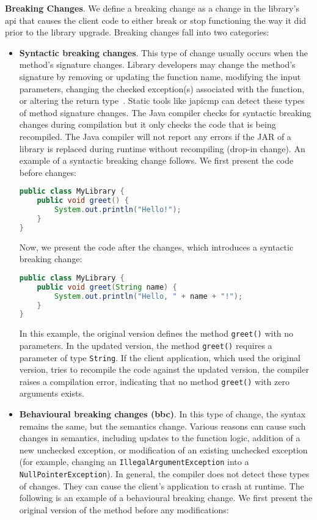 \textbf{Breaking Changes}. We define a breaking change as a change in the library's \gls{api} that
causes the client code to either break or stop functioning the way it did prior to the library upgrade.
Breaking changes fall into two categories:
\begin{itemize}
    \item \textbf{Syntactic breaking changes}. This type of change usually occurs when the method's
    signature changes. Library developers may change the method's signature by removing or updating
    the function name, modifying the input parameters, changing the checked exception(s) associated
    with the function, or altering the return type~\cite{jayasuriya24}. Static tools like japicmp
    can detect these types of method signature changes. The Java compiler checks for syntactic breaking
    changes during compilation but it only checks the code that is being recompiled. The Java compiler
    will not report any errors if the JAR of a library is replaced during runtime without recompiling
    (drop-in change). An example of a syntactic breaking change follows. We first present the
    code before changes:
    \begin{lstlisting}[language=java]
public class MyLibrary {
    public void greet() {
        System.out.println("Hello!");
    }
}
    \end{lstlisting}
    Now, we present the code after the changes, which introduces a syntactic breaking change:
    \begin{lstlisting}[language=java]
public class MyLibrary {
    public void greet(String name) {
        System.out.println("Hello, " + name + "!");
    }
}
    \end{lstlisting}
    In this example, the original version defines the method \texttt{greet()} with no parameters. In
    the updated version, the method \texttt{greet()} requires a parameter of type \texttt{String}. If
    the client application, which used the original version, tries to recompile the code against the
    updated version, the compiler raises a compilation error, indicating that no method
    \texttt{greet()} with zero arguments exists.

    \item \textbf{Behavioural breaking changes (\gls{bbc})}. In this type of change, the syntax remains
    the same, but the semantics change. Various reasons can cause such changes in semantics, including
    updates to the function logic, addition of a new unchecked exception, or modification of an existing
    unchecked exception (for example, changing an \texttt{IllegalArgumentException} into a
    \texttt{NullPointerException}). In general, the compiler does not detect these types of changes.
    They can cause the client's application to crash at runtime. The following is an example of a
    behavioural breaking change. We first present the original version of the method before any modifications:


\end{itemize}
